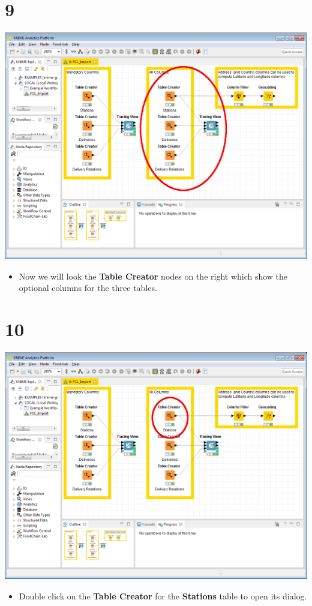 \documentclass{beamer}
\begin{document}
\section{9}
\begin{frame}
	\begin{center}
  		\includegraphics[height=0.6\textheight]{9.png}
	\end{center}
	\begin{itemize}
		\item Now we will look the \textbf{Table Creator} nodes on the right which show the optional columns for the three tables.
	\end{itemize}
\end{frame}

\section{10}
\begin{frame}
	\begin{center}
  		\includegraphics[height=0.6\textheight]{10.png}
	\end{center}
	\begin{itemize}
		\item Double click on the \textbf{Table Creator} for the \textbf{Stations} table to open its dialog.
	\end{itemize}
\end{frame}
\end{document}
